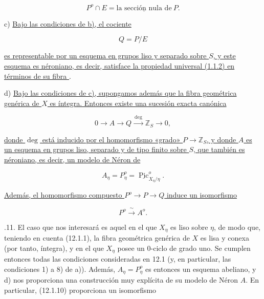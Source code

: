 \begin{equation}\tag{12.1.6}
 P^o\cap E=\underline{\text{la sección nula de}}\ P.
\end{equation}

\noindent
c) \underline{Bajo las condiciones de b), el cociente}

\begin{equation}\tag{12.1.7}
 Q=P/E
\end{equation}

\noindent
\underline{es representable por un esquema en grupos liso y separado
sobre $S$, y este esquema es néroniano, es decir, satisface la propiedad
universal (1.1.2) en términos de su fibra }.

\medskip
\noindent
d) \underline{Bajo las condiciones de c), supongamos además que la fibra
geométrica genérica de $X$ es íntegra. Entonces existe una sucesión exacta
canónica}

\begin{equation}\tag{12.1.8}
 0\longrightarrow A\longrightarrow Q
   \xrightarrow{\ \deg\ }\mathbb Z_S\longrightarrow0,
\end{equation}

\noindent
\underline{donde $\deg$ está inducido por el homomorfismo «grado»
$P\to\mathbb Z_S$, y donde $A$ es un esquema en grupos liso, separado y
de tipo finito sobre $S$, que también es néroniano, es decir, un modelo
de Néron de}

\begin{equation}\tag{12.1.9}
 A_\eta=P_\eta^o=
 \underline{\operatorname{Pic}}^o_{X_\eta/\eta}.
\end{equation}

\noindent
\underline{Además, el homomorfismo compuesto $P^o\to P\to Q$ induce un
isomorfismo}

\begin{equation}\tag{12.1.10}
 P^o\xrightarrow{\ \sim\ }A^o.
\end{equation}


\medskip
{}.11. El caso que nos interesará es aquel en el que $X_\eta$ es liso
sobre $\eta$, de modo que, teniendo en cuenta (12.1.1), la fibra
geométrica genérica de $X$ es lisa y conexa (por tanto, íntegra), y en el
que $X_\eta$ posee un $0$-ciclo de grado uno. Se cumplen entonces todas
las condiciones consideradas en 12.1 (y, en particular, las condiciones
1) a 8) de a)). Además, $A_\eta=P_\eta^o$ es entonces un esquema
abeliano, y d) nos proporciona una construcción muy explícita de su
modelo de Néron $A$. En particular, (12.1.10) proporciona un isomorfismo

